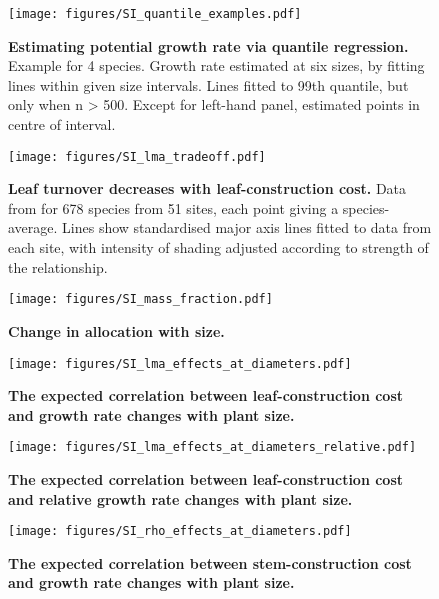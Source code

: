 \documentclass[12pt, a4paper]{article}
\makeatletter
\def\maxwidth{\ifdim\Gin@nat@width>\linewidth\linewidth
\else\Gin@nat@width\fi}
\let\Oldincludegraphics\includegraphics
\renewcommand{\includegraphics}[1]{\Oldincludegraphics[width=\maxwidth]{#1}}
\makeatother
\begin{document}
\begin{appendices}
\begin{figure}[ht]
\centering
\texttt{[image: figures/SI\_quantile\_examples.pdf]}
\caption{\textbf{Estimating potential growth rate via quantile
regression.} Example for 4 species. Growth rate estimated at six sizes,
by fitting lines within given size intervals. Lines fitted to 99th
quantile, but only when n \textgreater{} 500. Except for left-hand
panel, estimated points in centre of interval.
\label{fS-quantile_examples}}
\end{figure}

\newpage

\begin{figure}[ht]
\centering
\texttt{[image: figures/SI\_lma\_tradeoff.pdf]}
\caption{\textbf{Leaf turnover decreases with leaf-construction cost.}
Data from \citep{wright_world-2004} for 678 species from 51 sites, each
point giving a species-average. Lines show standardised major axis lines
fitted to data from each site, with intensity of shading adjusted
according to strength of the relationship.\label{fS-leaf}}
\end{figure}


\newpage

\begin{figure}[ht]
\centering
\texttt{[image: figures/SI\_mass\_fraction.pdf]}
\caption{\textbf{Change in allocation with size.}
\label{f-mass_fraction}}
\end{figure}

\newpage

\begin{figure}[ht]
\centering
\texttt{[image: figures/SI\_lma\_effects\_at\_diameters.pdf]}
\caption{\textbf{The expected correlation between leaf-construction cost
and growth rate changes with plant size.} \label{f-lma_growth_size}}
\end{figure}

\begin{figure}[ht]
\centering
\texttt{[image: figures/SI\_lma\_effects\_at\_diameters\_relative.pdf]}
\caption{\textbf{The expected correlation between leaf-construction cost
and relative growth rate changes with plant size.}
\label{f-lma_growth_size_relative}}
\end{figure}

\begin{figure}[ht]
\centering
\texttt{[image: figures/SI\_rho\_effects\_at\_diameters.pdf]}
\caption{\textbf{The expected correlation between stem-construction cost
and growth rate changes with plant size.} \label{f-rho_growth_size}}
\end{figure}


\end{appendices}
\end{document}
